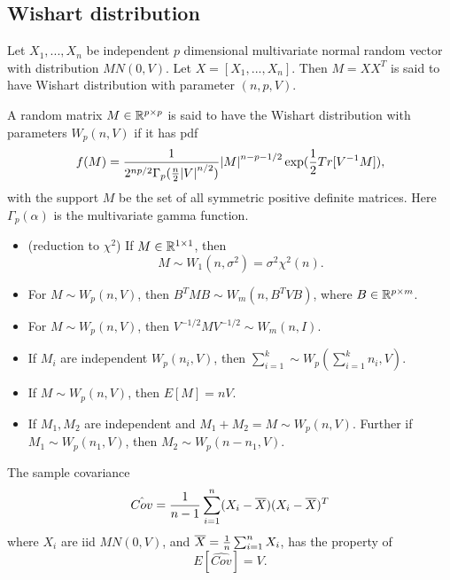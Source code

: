 \begin{refsection}
\subsection{Wishart distribution}
\begin{definition}
	Let $X_1,...,X_n$ be independent $p$ dimensional multivariate normal random vector with distribution $MN(0,V)$. Let $X = [X_1,...,X_n]$. Then $M = XX^T$ is said to have Wishart distribution with parameter $(n,p,V)$.
\end{definition}

\begin{definition}
	A random matrix $M\in \mathbb{R}^{p\times p}$ is said to have the Wishart distribution with parameters $W_p(n,V)$ if it has pdf 
	$$f(M) = \frac{1}{2^{np/2}\Gamma_p(\frac{n}{2}\abs{V}^{n/2})}\abs{M}^{n-p-1/2}\exp(\frac{1}{2}Tr[V^{-1}M]),$$
	with the support $M$ be the set of all symmetric positive definite matrices. Here $\Gamma_p(\alpha)$ is the multivariate gamma function. 	
\end{definition}


\begin{lemma}\hfill
	\begin{itemize}
		\item (reduction to $\chi^2$) If $M\in \mathbb{R}^{1\times 1}$, then
		$$M\sim W_1(n, \sigma^2) = \sigma^2 \chi^2(n).$$
		\item For $M\sim W_p(n,V)$, then $B^TMB \sim W_m(n,B^TVB)$, where $B\in \mathbb{R}^{p\times m}$.
		\item For $M\sim W_p(n,V)$, then $V^{-1/2}MV^{-1/2} \sim W_m(n,I).$
		\item If $M_i$ are independent $W_p(n_i,V)$, then $\sum_{i=1}^k \sim W_p(\sum_{i=1}^k n_i,V)$.
		\item If $M\sim W_p(n,V)$, then $E[M] = nV$.
		\item If $M_1,M_2$ are independent and $M_1+M_2 = M\sim W_p(n,V)$. Further if $M_1\sim W_p(n_1,V)$, then $M_2\sim W_p(n-n_1,V)$.
	\end{itemize}
\end{lemma}


\begin{lemma}
	The sample covariance
	$$\hat{Cov} = \frac{1}{n-1}\sum_{i=1}^n (X_i - \overline{X})(X_i-\overline{X})^T$$
	where $X_i$ are iid $MN(0,V)$, and $\overline{X} = \frac{1}{n}\sum_{i=1}^n X_i$, has the property of
	$$E[\hat{Cov}] = V.$$
\end{lemma}




\end{refsection}
